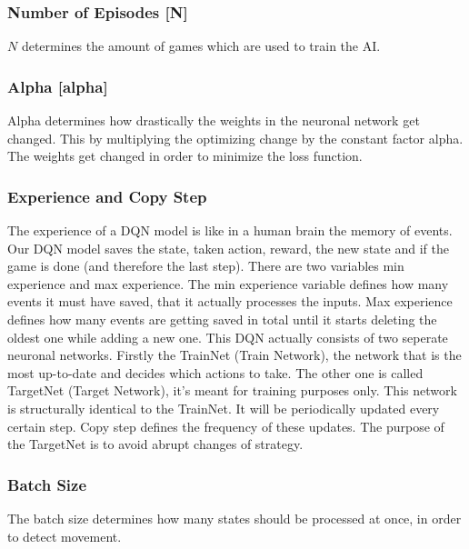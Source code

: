 \documentclass[12pt]{article}
\def\alpha{alpha}%
\def\({}%
\def\){}%
\begin{document}
\subsubsection{Number of Episodes [\(N\)]}
$N$ determines the amount of games which are used to train the AI.

\subsubsection{Alpha [\(\alpha\)]}
Alpha determines how drastically the weights in the neuronal network get changed. This by multiplying the optimizing change by the constant factor alpha. The weights get changed in order to minimize the loss function.

\subsubsection{Experience and Copy Step}
The experience of a DQN model is like in a human brain the memory of events. Our DQN model saves the state, taken action, reward, the new state and if the game is done (and therefore the last step). There are two variables min experience and max experience. The min experience variable defines how many events it must have saved, that it actually processes the inputs. Max experience defines how many events are getting saved in total until it starts deleting the oldest one while adding a new one. 
This DQN actually consists of two seperate neuronal networks. Firstly the TrainNet (Train Network), the network that is the most up-to-date and decides which actions to take. The other one is called TargetNet (Target Network), it’s meant for training purposes only. This network is structurally identical to the TrainNet. It will be periodically updated every certain step. Copy step defines the frequency of these updates. The purpose of the TargetNet is to avoid abrupt changes of strategy. 

\subsubsection{Batch Size}
The batch size determines how many states should be processed at once, in order to detect movement. 
\end{document}
